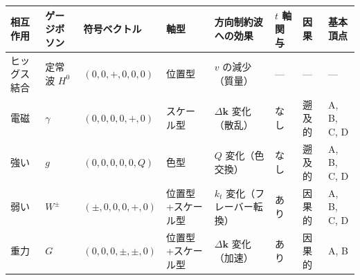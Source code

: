 \documentclass[
  a4paper,11pt]{ltjsarticle}
\newcounter{none}
\theoremstyle{definition}
\theoremstyle{remark}
\begin{document}
{\def\LTcaptype{none} %
\begin{longtable}[]{@{}
  >{\raggedright\arraybackslash}p{}
  >{\raggedright\arraybackslash}p{}
  >{\raggedright\arraybackslash}p{}
  >{\raggedright\arraybackslash}p{}
  >{\raggedright\arraybackslash}p{}
  >{\raggedright\arraybackslash}p{}
  >{\raggedright\arraybackslash}p{}
  >{\raggedright\arraybackslash}p{}@{}}
\toprule\noalign{}
\begin{minipage}[b]{\linewidth}\raggedright
相互作用
\end{minipage} & \begin{minipage}[b]{\linewidth}\raggedright
ゲージボソン
\end{minipage} & \begin{minipage}[b]{\linewidth}\raggedright
符号ベクトル
\end{minipage} & \begin{minipage}[b]{\linewidth}\raggedright
軸型
\end{minipage} & \begin{minipage}[b]{\linewidth}\raggedright
方向制約波への効果
\end{minipage} & \begin{minipage}[b]{\linewidth}\raggedright
\(t\) 軸関与
\end{minipage} & \begin{minipage}[b]{\linewidth}\raggedright
因果
\end{minipage} & \begin{minipage}[b]{\linewidth}\raggedright
基本頂点
\end{minipage} \\
\midrule\noalign{}
\endhead
\bottomrule\noalign{}
\endlastfoot
ヒッグス結合 & 定常波 \(H^0\) & \((0,0,+,0,0,0)\) & 位置型 & \(v\)
の減少（質量） & --- & --- & --- \\
電磁 & \(\gamma\) & \((0,0,0,0,+,0)\) & スケール型 &
\(\Delta\mathbf{k}\) 変化（散乱） & なし & 遡及的 & A, B, C, D \\
強い & \(g\) & \((0,0,0,0,0,Q)\) & 色型 & \(Q\) 変化（色交換） & なし &
遡及的 & A, B, C, D \\
弱い & \(W^{\pm}\) & \((\pm,0,0,0,+,0)\) & 位置型+スケール型 & \(k_t\)
変化（フレーバー転換） & あり & 因果的 & A, B, C, D \\
重力 & \(G\) & \((0,0,0,\pm,\pm,0)\) & 位置型+スケール型 &
\(\Delta\mathbf{k}\) 変化（加速） & あり & 因果的 & A, B \\
\end{longtable}
}
\end{document}
